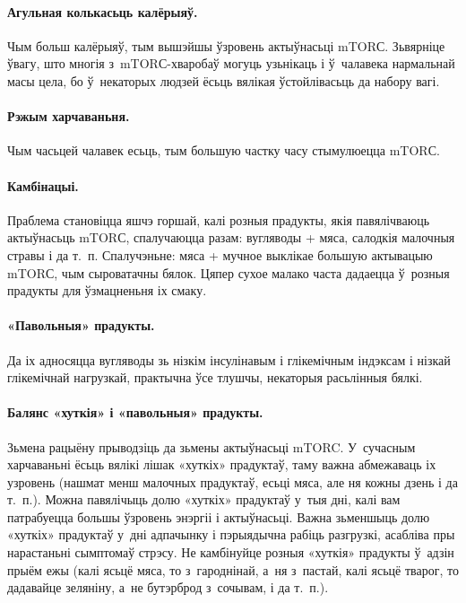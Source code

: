 \paragraph{Агульная колькасьць калёрыяў.}
Чым больш калёрыяў, тым вышэйшы ўзровень актыўнасьці mTORС. Зьвярніце ўвагу, што многія з~mTORС-хваробаў могуць узьнікаць і ў~чалавека нармальнай масы цела, бо ў~некаторых людзей ёсьць вялікая ўстойлівасьць да набору вагі.

\paragraph{Рэжым харчаваньня.}
Чым часьцей чалавек есьць, тым большую частку часу стымулюецца mTORС.

\paragraph{Камбінацыі.}
Праблема становіцца яшчэ горшай, калі розныя прадукты, якія павялічваюць актыўнасьць mTORС, спалучаюцца разам: вугляводы + мяса, салодкія малочныя стравы і да т.~п. Спалучэньне: мяса + мучное выклікае большую актывацыю mTORС, чым сыроватачны бялок. Цяпер сухое малако часта дадаецца ў~розныя прадукты для ўзмацненьня іх смаку.

\paragraph{«Павольныя» прадукты.}
Да іх адносяцца вугляводы зь нізкім інсулінавым і глікемічным індэксам і нізкай глікемічнай нагрузкай, практычна ўсе тлушчы, некаторыя расьлінныя бялкі.

\paragraph{Балянс «хуткія» і «павольныя» прадукты.}
Зьмена рацыёну прыводзіць да зьмены актыўнасьці mTORC. У~сучасным харчаваньні ёсьць вялікі лішак «хуткіх» прадуктаў, таму важна абмежаваць іх узровень (нашмат менш малочных прадуктаў, есьці мяса, але ня кожны дзень і да т.~п.). Можна павялічыць долю «хуткіх» прадуктаў у~тыя дні, калі вам патрабуецца большы ўзровень энэргіі і актыўнасьці. Важна зьменшыць долю «хуткіх» прадуктаў у~дні адпачынку і пэрыядычна рабіць разгрузкі, асабліва пры нарастаньні сымптомаў стрэсу. Не камбінуйце розныя «хуткія» прадукты ў~адзін прыём ежы (калі ясьцё мяса, то з~гароднінай, а~ня з~пастай, калі ясьцё тварог, то дадавайце зеляніну, а~не бутэрброд з~сочывам, і да т.~п.).

